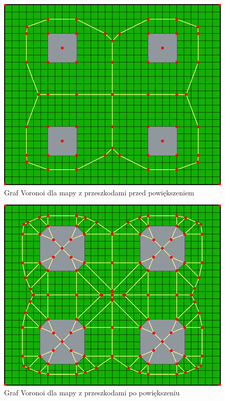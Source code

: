 \documentclass[a4paper,11pt,twoside]{report}
\theoremstyle{definition}
\begin{document}
\begin{figure}[h!]
\centering
\includegraphics[scale=0.36]{voronoiGraphForMap}
\caption[Graf Voronoi dla mapy z przeszkodami przed powiększeniem]{Graf Voronoi dla mapy z przeszkodami przed powiększeniem}
\end{figure}

\newpage

\begin{figure}[h!]
\centering
\includegraphics[scale=0.36]{voronoiGraphForExpandedMap}
\caption[Graf Voronoi dla mapy z przeszkodami po powiększeniu]{Graf Voronoi dla mapy z przeszkodami po powiększeniu}
\end{figure}
\end{document}
